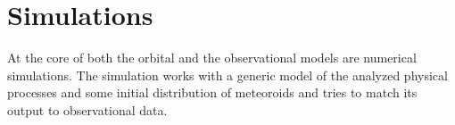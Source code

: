 \section{Simulations} \label{mi}
    At the core of both the orbital and the observational models are numerical simulations.
    The simulation works with a generic model of the analyzed physical processes and some initial
    distribution of meteoroids and tries to match its output to observational data.


%
%
%
%
